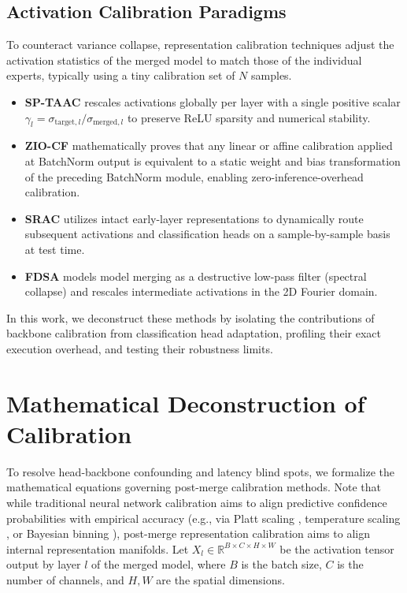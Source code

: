 \documentclass{article}
\theoremstyle{plain}
\theoremstyle{definition}
\theoremstyle{remark}
\begin{document}
\subsection{Activation Calibration Paradigms}
To counteract variance collapse, representation calibration techniques adjust the activation statistics of the merged model to match those of the individual experts, typically using a tiny calibration set of $N$ samples.
\begin{itemize}
    \item \textbf{SP-TAAC} \cite{Agent2026} rescales activations globally per layer with a single positive scalar $\gamma_l = \sigma_{\text{target}, l} / \sigma_{\text{merged}, l}$ to preserve ReLU sparsity and numerical stability.
    \item \textbf{ZIO-CF} \cite{Pragmatist2026} mathematically proves that any linear or affine calibration applied at BatchNorm output is equivalent to a static weight and bias transformation of the preceding BatchNorm module, enabling zero-inference-overhead calibration.
    \item \textbf{SRAC} \cite{Anonymous2026a} utilizes intact early-layer representations to dynamically route subsequent activations and classification heads on a sample-by-sample basis at test time.
    \item \textbf{FDSA} \cite{Visionary2026} models model merging as a destructive low-pass filter (spectral collapse) and rescales intermediate activations in the 2D Fourier domain.
\end{itemize}
In this work, we deconstruct these methods by isolating the contributions of backbone calibration from classification head adaptation, profiling their exact execution overhead, and testing their robustness limits.

\section{Mathematical Deconstruction of Calibration}
\label{sec:deconstruction}

To resolve head-backbone confounding and latency blind spots, we formalize the mathematical equations governing post-merge calibration methods. Note that while traditional neural network calibration aims to align predictive confidence probabilities with empirical accuracy (e.g., via Platt scaling \cite{Platt1999}, temperature scaling \cite{Guo2017}, or Bayesian binning \cite{Naeini2015, Zadrozny2001}), post-merge representation calibration aims to align internal representation manifolds. Let $X_l \in \mathbb{R}^{B \times C \times H \times W}$ be the activation tensor output by layer $l$ of the merged model, where $B$ is the batch size, $C$ is the number of channels, and $H, W$ are the spatial dimensions.
\end{document}
